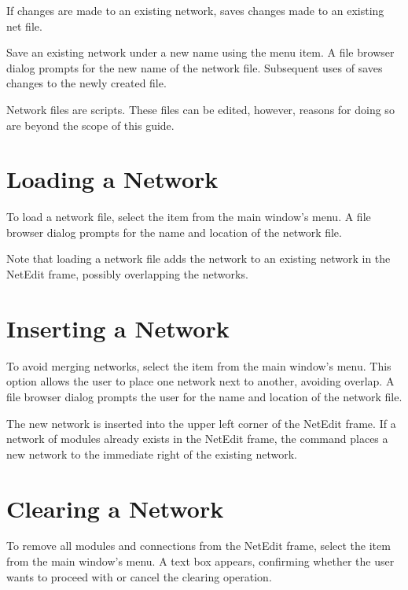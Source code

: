 If  changes are made to an existing network,  
saves changes made to an existing net file.

Save an existing network under a new name using the
 menu item.  A file browser dialog prompts
for the new name of the network file.  Subsequent uses of
 saves changes to the newly created file.

Network files are   scripts.
These files can be edited, however, reasons for doing so are beyond
the scope of this guide.

\section{Loading a Network}
\label{sec:opennet}

To load a network file, select the  item from the main
window's  menu.   A file browser dialog prompts for the
name and location of the network file.

Note that loading a network file adds the network to an existing network in
the NetEdit frame, possibly overlapping the networks.

\section{Inserting a Network}
\label{sec:insertnetwork}

To avoid merging networks, select the
 item from the main window's  menu. This
option allows the user to place one \sr{} network next to another,
avoiding overlap.  A file browser dialog prompts the user for the name and
location of the network file.

The new network is inserted into the upper left corner of the
NetEdit frame.  If a network of modules already exists in the NetEdit
frame, the  command places a new network to the
immediate right of the existing network.

\section{Clearing a Network}
\label{sec:clearnetwork}

To remove all modules and connections from the 
NetEdit frame, select the  item from the main window's
 menu.  A text box appears, confirming whether the
user wants to proceed with or cancel the clearing operation.

